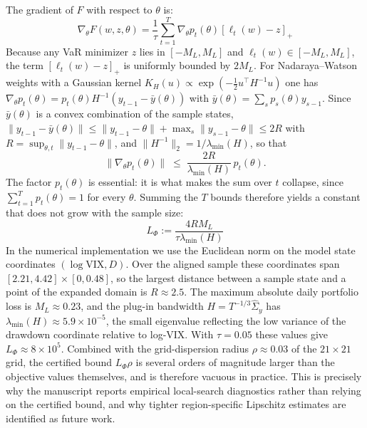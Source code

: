 \documentclass[smallextended]{svjour3}
\begin{document}
The gradient of $F$ with respect to $\theta$ is:
\begin{equation}
    \nabla_\theta F(w, z, \theta) = \frac{1}{\tau} \sum_{t=1}^T \nabla_\theta p_t(\theta) [\ell_t(w) - z]_+
\end{equation}
Because any VaR minimizer $z$ lies in $[-M_L, M_L]$ and $\ell_t(w) \in [-M_L, M_L]$, the term $[\ell_t(w) - z]_+$ is uniformly bounded by $2M_L$. For Nadaraya--Watson weights with a Gaussian kernel $K_H(u) \propto \exp(-\frac{1}{2} u^\top H^{-1} u)$ one has $\nabla_\theta p_t(\theta) = p_t(\theta) H^{-1}(y_{t-1} - \bar y(\theta))$ with $\bar y(\theta) = \sum_s p_s(\theta) y_{s-1}$. Since $\bar y(\theta)$ is a convex combination of the sample states, $\|y_{t-1} - \bar y(\theta)\| \le \|y_{t-1}-\theta\| + \max_s \|y_{s-1}-\theta\| \le 2R$ with $R = \sup_{\theta, t} \|y_{t-1} - \theta\|$, and $\|H^{-1}\|_2 = 1/\lambda_{\min}(H)$, so that
\begin{equation}
    \|\nabla_\theta p_t(\theta)\| \;\le\; \frac{2R}{\lambda_{\min}(H)}\, p_t(\theta).
\end{equation}
The factor $p_t(\theta)$ is essential: it is what makes the sum over $t$ collapse, since $\sum_{t=1}^T p_t(\theta) = 1$ for every $\theta$. Summing the $T$ bounds therefore yields a constant that does not grow with the sample size:
\begin{equation}
    L_\Phi := \frac{4 R M_L}{\tau \lambda_{\min}(H)}
\end{equation}
In the numerical implementation we use the Euclidean norm on the model state
coordinates $(\log \mathrm{VIX}, D)$. Over the aligned sample these coordinates
span $[2.21, 4.42] \times [0, 0.48]$, so the largest distance between a sample
state and a point of the expanded domain is $R \approx 2.5$. The maximum
absolute daily portfolio loss is $M_L \approx 0.23$, and the plug-in bandwidth
$H = T^{-1/3}\widehat\Sigma_y$ has $\lambda_{\min}(H) \approx 5.9 \times 10^{-5}$,
the small eigenvalue reflecting the low variance of the drawdown coordinate
relative to log-VIX. With $\tau = 0.05$ these values give
$L_\Phi \approx 8 \times 10^{5}$. Combined with the grid-dispersion radius
$\rho \approx 0.03$ of the $21 \times 21$ grid, the certified bound
$L_\Phi \rho$ is several orders of magnitude larger than the objective values
themselves, and is therefore vacuous in practice. This is precisely why the
manuscript reports empirical local-search diagnostics rather than relying on
the certified bound, and why tighter region-specific Lipschitz estimates are
identified as future work.
\end{document}
